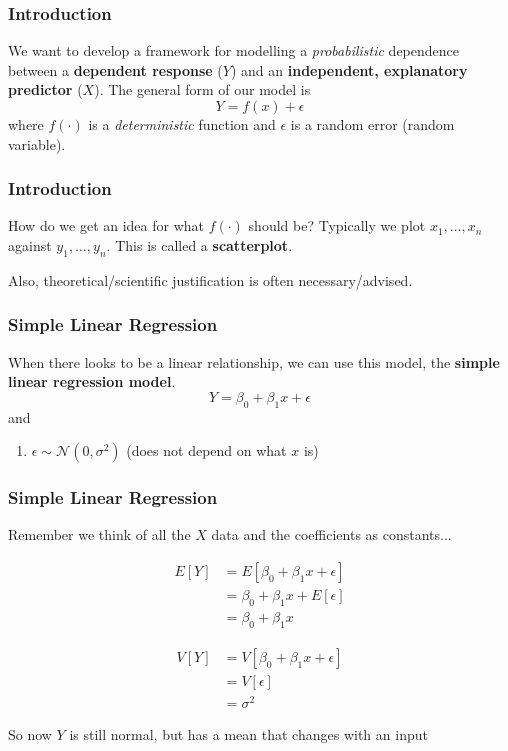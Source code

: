 \documentclass{beamer}
\begin{document}
\begin{frame}
\frametitle{Introduction}

We want to develop a framework for modelling a \emph{probabilistic} dependence between a \textbf{dependent response} ($Y$) and an \textbf{independent, explanatory predictor} ($X$). The general form of our model is 
\[
Y = f(x) + \epsilon
\]
where $f(\cdot)$ is a \emph{deterministic} function and $\epsilon$ is a random error (random variable).


\end{frame}
\begin{frame}
\frametitle{Introduction}

How do we get an idea for what $f(\cdot)$ should be? Typically we plot $x_1, \ldots, x_n$ against $y_1, \ldots, y_n$. This is called a \textbf{scatterplot}.
\newline

Also, theoretical/scientific justification is often necessary/advised.

\end{frame}
\begin{frame}
\frametitle{Simple Linear Regression}

When there looks to be a linear relationship, we can use this model, the \textbf{simple linear regression model}.
\[
Y = \beta_0 +\beta_1 x + \epsilon
\]
and 
\begin{enumerate}
\item $\epsilon \sim \mathcal{N}(0, \sigma^2)$ (does not depend on what $x$ is)
\end{enumerate}

\end{frame}
\begin{frame}
\frametitle{Simple Linear Regression}

Remember we think of all the $X$ data and the coefficients as constants...

\begin{align*}
E[Y] &= E[\beta_0 +\beta_1 x + \epsilon ] \\
&= \beta_0 +\beta_1 x + E[\epsilon] \\
&= \beta_0 + \beta_1x 
\end{align*}

\begin{align*}
V[Y] &= V[\beta_0 +\beta_1 x + \epsilon ] \\
&= V[\epsilon] \\
&= \sigma^2
\end{align*}

So now $Y$ is still normal, but has a mean that changes with an input
\end{frame}
\end{document}
